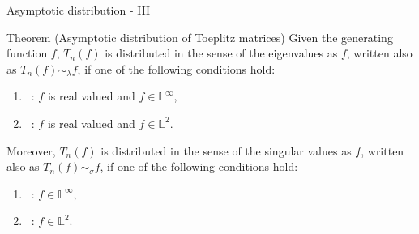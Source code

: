 \documentclass[aspectratio=169,xcolor=dvipsnames]{beamer}
\begin{document}
\begin{frame}{Asymptotic distribution - III}

\begin{alertblock}{Theorem (Asymptotic distribution of Toeplitz matrices)}
Given the generating function $f$, $T_n(f)$ is distributed in the sense of
the eigenvalues as $f$, written also as $T_n(f)
\sim_{\lambda} f$, if one of the following conditions hold:
\begin{enumerate}
	\item~\parencite{grenander2001toeplitz}: $f$ is real valued and $f
	\in \mathbb{L}^{\infty}$,
	\item~\parencite{tyrtyshnikov1996unifying}: $f$ is real valued and $f
	\in \mathbb{L}^{2}$.
\end{enumerate}
Moreover, $T_n(f)$ is distributed in the sense of
the singular values as $f$, written also as
$T_n(f) \sim_{\sigma} f$, if one of the following conditions
hold:
\begin{enumerate}
	\item~\parencite{avram1988bilinear,parter1986distribution}: $f \in
	\mathbb{L}^{\infty}$,
	\item~\parencite{tyrtyshnikov1996unifying}: $f \in \mathbb{L}^{2}$.
\end{enumerate}
\end{alertblock}

\end{frame}
\end{document}
